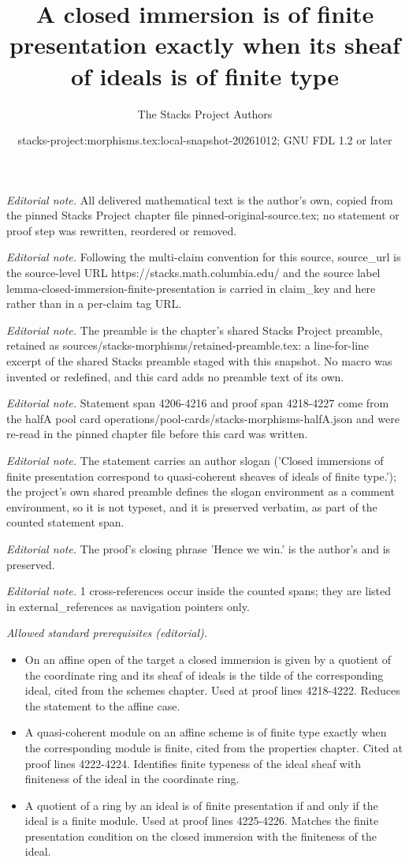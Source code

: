 \documentclass[10pt,a4paper]{amsart}
\title{A closed immersion is of finite presentation exactly when its sheaf of ideals is of finite type}
\author{The Stacks Project Authors}
\date{stacks-project:morphisms.tex:local-snapshot-20261012; GNU FDL 1.2 or later}
\theoremstyle{plain}
\theoremstyle{definition}
\theoremstyle{remark}
\numberwithin{equation}{subsection}
\begin{document}
\maketitle
\noindent\textit{Editorial note.} All delivered mathematical text is the author's own, copied from the pinned Stacks Project chapter file pinned-original-source.tex; no statement or proof step was rewritten, reordered or removed.\par\medskip
\noindent\textit{Editorial note.} Following the multi-claim convention for this source, source\_url is the source-level URL https://stacks.math.columbia.edu/ and the source label lemma-closed-immersion-finite-presentation is carried in claim\_key and here rather than in a per-claim tag URL.\par\medskip
\noindent\textit{Editorial note.} The preamble is the chapter's shared Stacks Project preamble, retained as sources/stacks-morphisms/retained-preamble.tex: a line-for-line excerpt of the shared Stacks preamble staged with this snapshot. No macro was invented or redefined, and this card adds no preamble text of its own.\par\medskip
\noindent\textit{Editorial note.} Statement span 4206-4216 and proof span 4218-4227 come from the halfA pool card operations/pool-cards/stacks-morphisms-halfA.json and were re-read in the pinned chapter file before this card was written.\par\medskip
\noindent\textit{Editorial note.} The statement carries an author slogan ('Closed immersions of finite presentation correspond to quasi-coherent sheaves of ideals of finite type.'); the project's own shared preamble defines the slogan environment as a comment environment, so it is not typeset, and it is preserved verbatim, as part of the counted statement span.\par\medskip
\noindent\textit{Editorial note.} The proof's closing phrase 'Hence we win.' is the author's and is preserved.\par\medskip
\noindent\textit{Editorial note.} 1 cross-references occur inside the counted spans; they are listed in external\_references as navigation pointers only.\par\medskip
\noindent\textit{Allowed standard prerequisites (editorial).}\begin{itemize}
\item On an affine open of the target a closed immersion is given by a quotient of the coordinate ring and its sheaf of ideals is the tilde of the corresponding ideal, cited from the schemes chapter. Used at proof lines 4218-4222. Reduces the statement to the affine case.
\item A quasi-coherent module on an affine scheme is of finite type exactly when the corresponding module is finite, cited from the properties chapter. Cited at proof lines 4222-4224. Identifies finite typeness of the ideal sheaf with finiteness of the ideal in the coordinate ring.
\item A quotient of a ring by an ideal is of finite presentation if and only if the ideal is a finite module. Used at proof lines 4225-4226. Matches the finite presentation condition on the closed immersion with the finiteness of the ideal.
\end{itemize}\medskip
\end{document}
